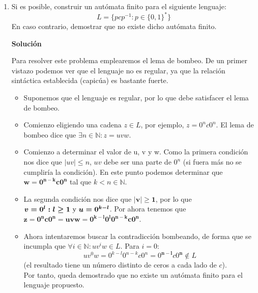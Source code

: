 \documentclass[12pt,spanish]{article}
\newenvironment{solution}{
	\par
	\textbf{Solución}
	\par
	\begin{center}
}
{
	\end{center}
}
\begin{document}
\begin{enumerate}
\begin{solution}
	\end{solution}
	\item Si es posible, construir un autómata finito para el siguiente lenguaje:
	\[
		L=\{pcp^{-1} : p \in \{0,1\}^{*}\}
	\]
	En caso contrario, demostrar que no existe dicho autómata finito.

	\begin{solution}
		Para resolver este problema emplearemos el lema de bombeo. De un primer vistazo podemos ver que el lenguaje no es regular, ya que la relación sintáctica establecida (capicúa) es bastante fuerte.
		\begin{itemize}
			\item Suponemos que el lenguaje es regular, por lo que debe satisfacer el lema de bombeo.
			\item Comienzo eligiendo una cadena $z \in L$, por ejemplo, $z=0^nc0^n$. El lema de bombeo dice que $\exists n \in \mathbb{N} : z=uvw$.
			\item Comienzo a determinar el valor de u, v y w. Como la primera condición nos dice que $|uv| \leq n$, $uv$ debe ser una parte de $0^n$ (si fuera más no se cumpliría la condición). En este punto podemos determinar que $\boldsymbol{w=0^{n-k}c0^n}$ tal que $k<n \in \mathbb{N}$.
			\item La segunda condición nos dice que $\boldsymbol{|v| \geq 1}$, por lo que $\boldsymbol{v=0^l : l \geq 1$ y $u=0^{k-l}}$.
			Por ahora tenemos que $\boldsymbol{z=0^nc0^n=uvw=0^{k-l}0^l0^{n-k}c0^n}$.
			\item Ahora intentaremos buscar la contradicción bombeando, de forma que se incumpla que $\forall i \in \mathbb{N} : uv^iw \in L$. Para $i=0$:
			\[
				uv^0w=0^{k-l}0^{n-k}c0^n=0^{\pmb{n-l}}c0^{\pmb{n}} \notin L
			\]
			(el resultado tiene un número distinto de ceros a cada lado de $c$).\\
			Por tanto, queda demostrado que no existe un autómata finito para el lenguaje propuesto.
		\end{itemize}
	\end{solution}
\end{enumerate}
\end{document}
